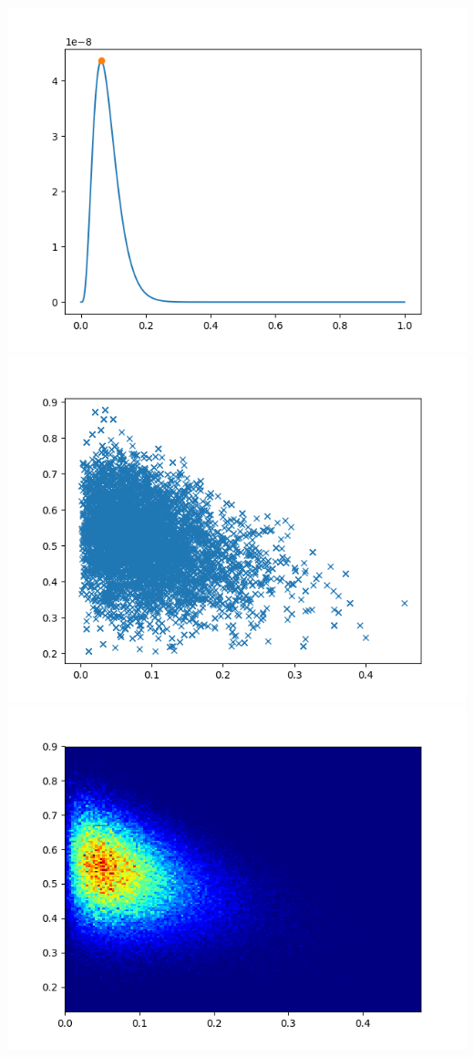 \documentclass[pt12]{article}
\begin{document}
\newpage

\begin{center}
\includegraphics[scale=0.5]{hip10.png}\\
\includegraphics[scale=0.5]{sc10.png}\\
\includegraphics[scale=0.5]{den10.png}\\
\end{center}
\end{document}
